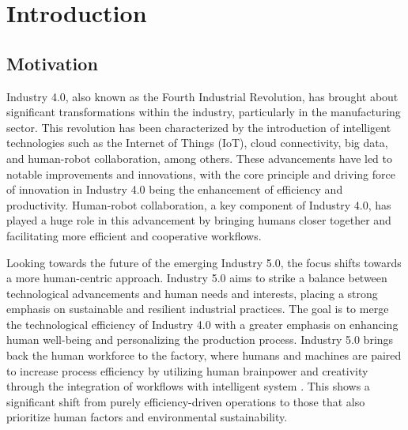 \chapter{Introduction}
\label{aufbau}

\section{Motivation}
Industry 4.0, also known as the Fourth Industrial Revolution, has brought about significant transformations within the industry, particularly in the manufacturing sector. This revolution has been characterized by the introduction of intelligent technologies such as the Internet of Things (IoT), cloud connectivity, big data, and human-robot collaboration, among others. These advancements have led to notable improvements and innovations, with the core principle and driving force of innovation in Industry 4.0 being the enhancement of efficiency and productivity. Human-robot collaboration, a key component of Industry 4.0, has played a huge role in this advancement by bringing humans closer together and facilitating more efficient and cooperative workflows. 

Looking towards the future of the emerging Industry 5.0, the focus shifts towards a more human-centric approach. Industry 5.0 aims to strike a balance between technological advancements and human needs and interests, placing a strong emphasis on sustainable and resilient industrial practices. The goal is to merge the technological efficiency of Industry 4.0 with a greater emphasis on enhancing human well-being and personalizing the production process. Industry 5.0 brings back the human workforce to the factory, where humans and machines are paired to increase 
process efficiency by utilizing human brainpower and creativity through the integration 
of workflows with intelligent system \parencite{hum1}.  This shows a significant shift from purely efficiency-driven operations to those that also prioritize human factors and environmental sustainability. 

